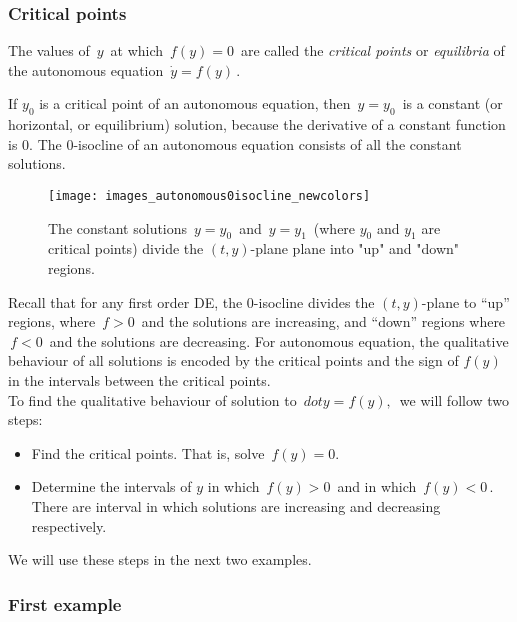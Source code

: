 \clearpage

\subsubsection{Critical points}

\begin{definition}
  The values of $\, y\,$ at which $\, f(y) = 0 \,$ are called
  the \emph{\color{blue} critical points} or \emph{\color{blue} equilibria} of
  the autonomous equation $\, \dot y = f(y)\,$. 
\end{definition}

If $y_0$ is a critical point of an autonomous equation, then $\, y = y_0\,$
is a constant (or horizontal, or equilibrium) solution,
because the derivative of a constant function is $0$.
The $0$-isocline of an autonomous equation consists of all the constant solutions.

\begin{figure}[ht!]
  \centering
  \texttt{[image: images\_autonomous0isocline\_newcolors]}
  \caption{The constant solutions $\,y=y_0\,$ and $\,y = y_1\,$ 
    (where $y_0$ and $y_1$ are critical points) divide 
    the $(t,y)$-plane plane into "up" and "down" regions.}
\end{figure}

Recall that for any first order DE, the $0$-isocline divides the $(t,y)$-plane to
``up'' regions, where $\, f > 0\,$ and the solutions are increasing,
and ``down'' regions where $\, f < 0\,$ and the solutions are decreasing.
For autonomous equation, the qualitative behaviour of all solutions is
encoded by the critical points and the sign of $f(y)$ in the intervals
between the critical points. \\

To find the qualitative behaviour of solution to $\, dot y = f(y),\,$ we will follow two steps:

\begin{itemize}
\item Find the critical points. That is, solve $\, f(y) = 0.\,$
\item Determine the intervals of $y$ in which $\, f(y) > 0\, $ and in which $\,f(y) < 0\,$.
  There are interval in which solutions are increasing and decreasing respectively. 
\end{itemize}

We will use these steps in the next two examples.

\clearpage

\subsubsection{First example}

